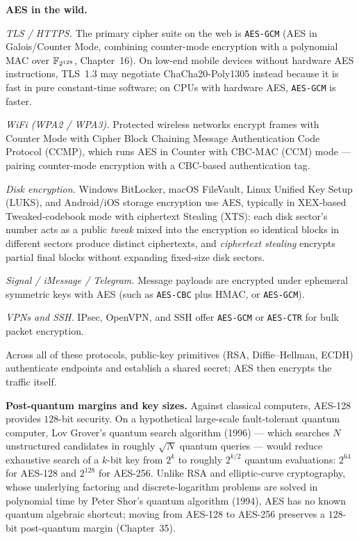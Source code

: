 \begin{applicationbox}
\textbf{AES in the wild.}

\emph{TLS / HTTPS.} The primary cipher suite on the web is \texttt{AES-GCM}
(AES in Galois/Counter Mode, combining counter-mode encryption with a polynomial
MAC over $\mathbb{F}_{2^{128}}$, Chapter~16). On low-end mobile devices without hardware
AES instructions, TLS~1.3 may negotiate ChaCha20-Poly1305 instead because it is
fast in pure constant-time software; on CPUs with hardware AES, \texttt{AES-GCM}
is faster.

\emph{WiFi (WPA2 / WPA3).} Protected wireless networks encrypt frames with Counter
Mode with Cipher Block Chaining Message Authentication Code Protocol (CCMP), which
runs AES in Counter with CBC-MAC (CCM) mode --- pairing counter-mode encryption
with a CBC-based authentication tag.

\emph{Disk encryption.} Windows BitLocker, macOS FileVault, Linux Unified Key
Setup (LUKS), and Android/iOS storage encryption use AES, typically in XEX-based
Tweaked-codebook mode with ciphertext Stealing (XTS): each disk sector's number
acts as a public \emph{tweak} mixed into the encryption so identical blocks in
different sectors produce distinct ciphertexts, and \emph{ciphertext stealing}
encrypts partial final blocks without expanding fixed-size disk sectors.

\emph{Signal / iMessage / Telegram.} Message payloads are encrypted under
ephemeral symmetric keys with AES (such as \texttt{AES-CBC} plus HMAC, or
\texttt{AES-GCM}).

\emph{VPNs and SSH.} IPsec, OpenVPN, and SSH offer \texttt{AES-GCM} or
\texttt{AES-CTR} for bulk packet encryption.

Across all of these protocols, public-key primitives (RSA, Diffie--Hellman, ECDH)
authenticate endpoints and establish a shared secret; AES then encrypts the
traffic itself.
\end{applicationbox}

\begin{whybox}
\textbf{Post-quantum margins and key sizes.} Against classical computers, AES-128
provides $128$-bit security. On a hypothetical large-scale fault-tolerant quantum
computer, Lov Grover's quantum search algorithm (1996) --- which searches $N$
unstructured candidates in roughly $\sqrt{N}$ quantum queries --- would reduce
exhaustive search of a $k$-bit key from $2^k$ to roughly $2^{k/2}$ quantum
evaluations: $2^{64}$ for AES-128 and $2^{128}$ for AES-256. Unlike RSA and
elliptic-curve cryptography, whose underlying factoring and discrete-logarithm
problems are solved in polynomial time by Peter Shor's quantum algorithm (1994),
AES has no known quantum algebraic shortcut; moving from AES-128 to AES-256
preserves a $128$-bit post-quantum margin (Chapter~35).
\end{whybox}

